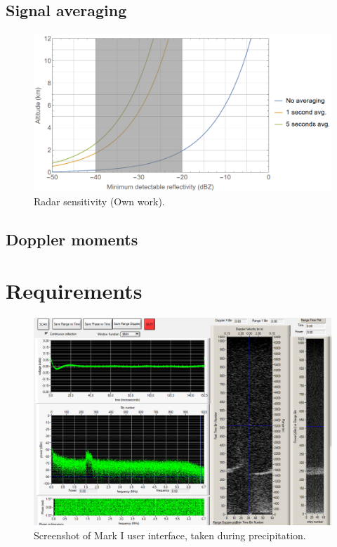 \documentclass{article}
\begin{document}
\subsection{Signal averaging}
\begin{figure}
	\centering
	\includegraphics[width=\textwidth]{sensitivity}
	\caption{Radar sensitivity  (Own work).}
	\label{fig:SlowFastTime}
\end{figure}

\subsection{Doppler moments}

\section{Requirements}

\begin{figure}
	\centering
	\includegraphics[width=\textwidth]{mark-1-rain}
	\caption{Screenshot of Mark I user interface, taken during precipitation.}
	\label{fig:Mark1Rain}
\end{figure}
\end{document}
